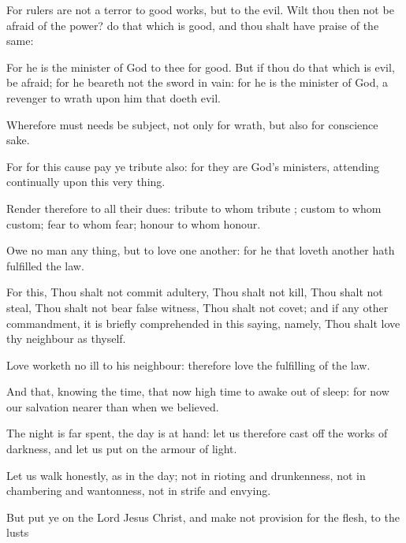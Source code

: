 {For
rulers
are
not a
terror
to
good
works,
but to the
evil. Wilt
thou
then
not be afraid
of the
power?
do that which is
good,
and thou shalt
have
praise
of the
same:

For he
is the
minister of
God to
thee
for
good.
But
if thou
do that which is
evil, be
afraid;
for he
beareth
not the
sword in
vain:
for he
is the
minister of
God, a
revenger
to
{}
wrath upon him that
doeth
evil.

Wherefore
{} must
needs be
subject,
not
only
for
wrath,
but
also
for conscience
sake.

For
for this
cause pay
ye
tribute
also:
for they
are
God’s
ministers, attending
continually
upon
this very
thing.

Render
therefore to
all their
dues:
tribute to
whom
tribute
{};
custom to
whom
custom;
fear to
whom
fear;
honour to
whom
honour.

Owe no
man any
thing,
but to
love one
another:
for he that
loveth
another hath
fulfilled the
law.

For
this, Thou
shalt
not commit
adultery, Thou
shalt
not
kill, Thou
shalt
not
steal, Thou
shalt
not bear false
witness, Thou
shalt
not
covet;
and
if
{}
any
other
commandment, it is briefly
comprehended
in
this
saying,
namely, Thou shalt
love
thy
neighbour
as
thyself.

Love
worketh
no
ill to his
neighbour:
therefore
love
{} the
fulfilling of the
law.

And
that,
knowing the
time,
that
now
{} high
time to
awake out
of
sleep:
for
now
{}
our
salvation
nearer
than
when we
believed.

The
night is far
spent, the
day is at
hand: let
us
therefore cast
off the
works of
darkness,
and let us put
on the
armour of
light.

Let us
walk
honestly,
as
in the
day;
not in
rioting
and
drunkenness,
not in
chambering
and
wantonness,
not in
strife
and
envying.

But put ye
on the
Lord
Jesus
Christ,
and
make
not
provision for the
flesh,
to
{} the
lusts
{}




\par }
